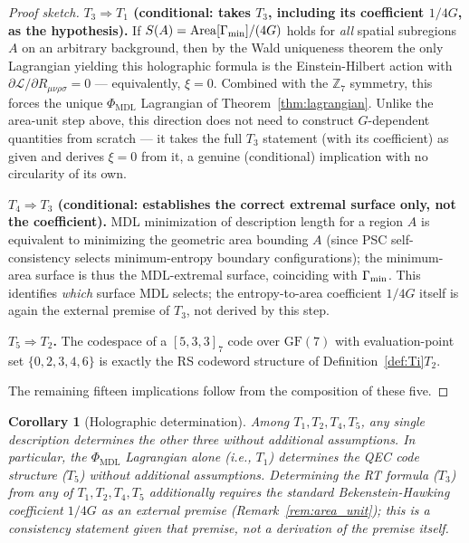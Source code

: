 \documentclass[11pt]{article}
\newtheorem{corollary}[theorem]{Corollary}
\theoremstyle{remark}
\newcommand{\PHIMDL}{\Phi_{\mathrm{MDL}}}
\newcommand{\ZS}{\mathbb{Z}_7}
\newcommand{\LL}{\mathcal{L}}
\begin{document}
\begin{proof}[Proof sketch]
\smallskip\noindent\textbf{$T_3\Rightarrow T_1$ (conditional: takes $T_3$, including
its coefficient $1/4G$, as the hypothesis).}  If $S(A) = \mathrm{Area}[\Gamma_{\rm
min}]/(4G)$ holds for \emph{all} spatial subregions $A$ on an arbitrary background,
then by the Wald uniqueness theorem the only Lagrangian yielding this holographic
formula is the Einstein-Hilbert action with $\partial\LL/\partial R_{\mu\nu\rho\sigma}=0$
--- equivalently, $\xi=0$.  Combined with the $\ZS$ symmetry, this forces the unique
$\PHIMDL$ Lagrangian of Theorem~\ref{thm:lagrangian}.  Unlike the area-unit step above,
this direction does not need to construct $G$-dependent quantities from scratch --- it
takes the full $T_3$ statement (with its coefficient) as given and derives $\xi=0$ from
it, a genuine (conditional) implication with no circularity of its own.

\smallskip\noindent\textbf{$T_4\Rightarrow T_3$ (conditional: establishes the correct
extremal surface only, not the coefficient).}  MDL minimization of description length
for a region $A$ is equivalent to minimizing the geometric area bounding $A$ (since PSC
self-consistency selects minimum-entropy boundary configurations); the minimum-area
surface is thus the MDL-extremal surface, coinciding with $\Gamma_{\rm min}$.  This
identifies \emph{which} surface MDL selects; the entropy-to-area coefficient $1/4G$
itself is again the external premise of $T_3$, not derived by this step.

\smallskip\noindent\textbf{$T_5\Rightarrow T_2$.}  The codespace of a $[5,3,3]_7$ code
over $\mathrm{GF}(7)$ with evaluation-point set $\{0,2,3,4,6\}$ is exactly the RS
codeword structure of Definition~\ref{def:Ti}$T_2$.

The remaining fifteen implications follow from the composition of these five.
\end{proof}

\begin{corollary}[Holographic determination]
\label{cor:ghet_corollary}
Among $T_1,T_2,T_4,T_5$, any single description determines the other three without
additional assumptions.  In particular, the $\PHIMDL$ Lagrangian alone (i.e., $T_1$)
determines the QEC code structure ($T_5$) without additional assumptions.  Determining
the RT formula ($T_3$) from any of $T_1,T_2,T_4,T_5$ additionally requires the standard
Bekenstein-Hawking coefficient $1/4G$ as an external premise (Remark~\ref{rem:area_unit});
this is a consistency statement given that premise, not a derivation of the premise
itself.
\end{corollary}
\end{document}
